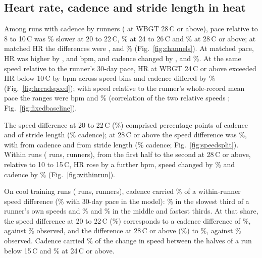 \documentclass[12pt]{article}
\newcommand{\degC}{\,\textdegree C}
\begin{document}
\subsection{Heart rate, cadence and stride length in heat}
Among \mechRuns{} runs with cadence by \mechRunners{} runners (\mechRunsHot{} at WBGT 28\degC{} or above), pace relative to 8 to 10\degC{} was \mechPaceTwenty\% slower at 20 to 22\degC, \mechPaceTwentyFour\% at 24 to 26\degC{} and \mechPaceHot\% at 28\degC{} or above; at matched HR the differences were \mechPaceAtHRTwenty, \mechPaceAtHRTwentyFour{} and \mechPaceAtHRHot\% (Fig.~\ref{fig:channels}). At matched pace, HR was higher by \mechHRTwenty, \mechHRTwentyFour{} and \mechHRHot{} bpm, and cadence changed by \mechCadTwenty, \mechCadTwentyFour{} and \mechCadHot\%. At the same speed relative to the runner's 30-day pace, HR at WBGT 24\degC{} or above exceeded HR below 10\degC{} by \relHRThirtyDay{} bpm across speed bins and cadence differed by \relCadThirtyDay\% (Fig.~\ref{fig:hrcadspeed}); with speed relative to the runner's whole-record mean pace the ranges were \relHRFixed{} bpm and \relCadFixed\% (correlation of the two relative speeds \relCorr; Fig.~\ref{fig:fixedbaseline}).

The speed difference at 20 to 22\degC{} (\splitSpeedTwenty\%) comprised \splitCadTwenty{} percentage points of cadence and \splitStrideTwenty{} of stride length (\splitCadShareTwenty\% cadence); at 28\degC{} or above the speed difference was \splitSpeedHot\%, with \splitCadHot{} from cadence and \splitStrideHot{} from stride length (\splitCadShareHot\% cadence; Fig.~\ref{fig:speedsplit}). Within runs (\driftRuns{} runs, \driftRunners{} runners), from the first half to the second at 28\degC{} or above, relative to 10 to 15\degC, HR rose by a further \driftHR{} bpm, speed changed by \driftSpeed\% and cadence by \driftCad\% (Fig.~\ref{fig:withinrun}).

On cool training runs (\benchCoolRuns{} runs, \benchCoolRunners{} runners), cadence carried \benchCadShare\% of a within-runner speed difference (\benchCadShareFit\% with 30-day pace in the model): \benchCadShareSlow\% in the slowest third of a runner's own speeds and \benchCadShareMid\% and \benchCadShareFast\% in the middle and fastest thirds. At that share, the speed difference at 20 to 22\degC{} (\benchSpeedMild\%) corresponds to a cadence difference of \benchCadOrdMild\%, against \benchCadObsMild\% observed, and the difference at 28\degC{} or above (\benchSpeedHot\%) to \benchCadOrdHot\%, against \benchCadObsHot\% observed. Cadence carried \benchHalfShareCool\% of the change in speed between the halves of a run below 15\degC{} and \benchHalfShareHot\% at 24\degC{} or above.
\end{document}
